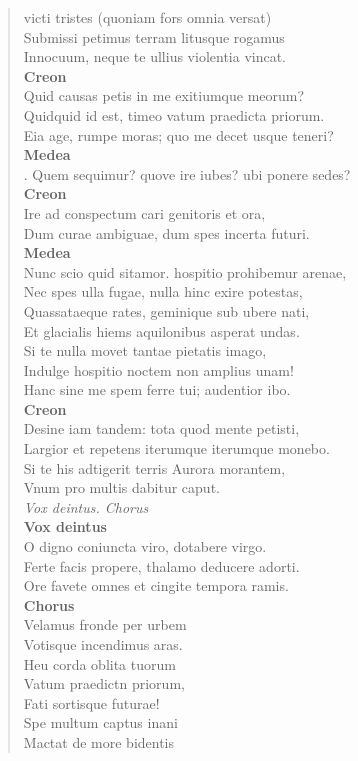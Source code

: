 \documentclass[11pt, a4paper]{report}
\begin{document}
\begin{verse}
{victi tristes (quoniam fors omnia versat) \rbrack  \\ Submissi petimus terram litusque rogamus \\ Innocuum, neque te ullius violentia vincat. \\ \textbf{Creon} \\Quid causas petis  \rbrack  in me exitiumque meorum? \\ Quidquid id est, timeo vatum praedicta priorum. \\ Eia age, rumpe moras; quo me decet usque teneri? \\ \textbf{Medea} \\. Quem sequimur? quove ire iubes? ubi ponere sedes? \\ \textbf{Creon} \\Ire ad conspectum cari genitoris et ora, \\ Dum curae ambiguae, dum spes incerta futuri. \\ \textbf{Medea} \\Nunc scio quid sitamor. hospitio prohibemur arenae, \\ Nec spes ulla fugae, nulla hinc exire potestas, \\ Quassataeque rates, geminique sub ubere nati, \\ Et glacialis hiems aquilonibus asperat undas. \\ Si te nulla movet tantae pietatis imago, \\ Indulge hospitio noctem non amplius unam! \\ Hanc sine me spem ferre tui; audentior ibo. \\ \textbf{Creon} \\Desine iam tandem: tota quod mente petisti, \\ Largior et repetens iterumque iterumque monebo. \\ Si te his adtigerit terris Aurora morantem, \\ Vnum pro multis dabitur caput. \\ \textit{Vox deintus. Chorus} \\ \textbf{Vox deintus} \\O digno coniuncta viro, dotabere virgo. \\ Ferte facis propere, thalamo deducere adorti. \\ Ore favete omnes et cingite tempora ramis. \\ \textbf{Chorus} \\Velamus fronde per urbem \\ Votisque incendimus aras. \\ Heu corda oblita tuorum \\ Vatum praedictn priorum, \\ Fati sortisque futurae! \\ Spe multum captus inani \\ Mactat de more bidentis \\ }
\end{verse}
\end{document}

